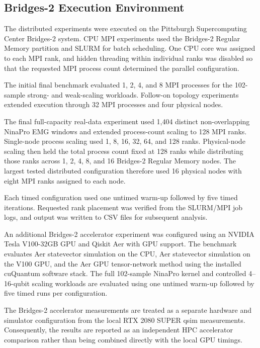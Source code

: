 \documentclass[pdflatex,sn-mathphys-num]{sn-jnl}%
\theoremstyle{thmstyleone}%
\theoremstyle{thmstyletwo}%
\theoremstyle{thmstylethree}%
\begin{document}
\subsection{Bridges-2 Execution Environment}
\label{subsec:bridges-method}

The distributed experiments were executed on the Pittsburgh Supercomputing
Center Bridges-2 system. CPU MPI experiments used the Bridges-2 Regular Memory
partition and SLURM for batch scheduling. One CPU core was assigned to each MPI
rank, and hidden threading within individual ranks was disabled so that the
requested MPI process count determined the parallel configuration.

The initial final benchmark evaluated 1, 2, 4, and 8 MPI processes for the
102-sample strong- and weak-scaling workloads. Follow-on topology experiments
extended execution through 32 MPI processes and four physical nodes.

The final full-capacity real-data experiment used 1,404 distinct
non-overlapping NinaPro EMG windows and extended process-count scaling to
128 MPI ranks. Single-node process scaling used 1, 8, 16, 32, 64, and 128
ranks. Physical-node scaling then held the total process count fixed at
128 ranks while distributing those ranks across 1, 2, 4, 8, and 16 Bridges-2
Regular Memory nodes. The largest tested distributed configuration therefore
used 16 physical nodes with eight MPI ranks assigned to each node.

Each timed configuration used one untimed warm-up followed by five timed
iterations. Requested rank placement was verified from the SLURM/MPI job logs,
and output was written to CSV files for subsequent analysis.

An additional Bridges-2 accelerator experiment was configured using an
NVIDIA Tesla V100-32GB GPU and Qiskit Aer with GPU support. The benchmark
evaluates Aer statevector simulation on the CPU, Aer statevector simulation
on the V100 GPU, and the Aer GPU tensor-network method using the installed
cuQuantum software stack. The full 102-sample NinaPro kernel and controlled
4--16-qubit scaling workloads are evaluated using one untimed warm-up followed
by five timed runs per configuration.

The Bridges-2 accelerator measurements are treated as a separate hardware and
simulator configuration from the local RTX 2080 SUPER qsim measurements.
Consequently, the results are reported as an independent HPC accelerator
comparison rather than being combined directly with the local GPU timings.
\end{document}
